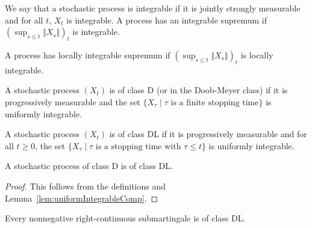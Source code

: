 \begin{definition}\label{def:HasIntegrableSup}
  \leanok
We say that a stochastic process is integrable if it is jointly strongly measurable and for all $t$, $X_t$ is integrable.
A process has an integrable supremum if $(\sup_{s \le t} \Vert X_s \Vert)_t$ is integrable.
\end{definition}

\begin{definition}\label{def:locallyIntegrableSup}
  \leanok
A process has locally integrable supremum if $(\sup_{s \le t} \Vert X_s \Vert)_t$ is locally integrable.
\end{definition}


\begin{definition}\label{def:classD}
  \leanok
A stochastic process $(X_t)$ is of class D (or in the Doob-Meyer class) if it is progressively measurable and the set $\{X_\tau \mid \tau \text{ is a finite stopping time}\}$ is uniformly integrable.
\end{definition}


\begin{definition}[Class DL]\label{def:classDL}
  \leanok
A stochastic process $(X_t)$ is of class DL if it is progressively measurable and for all $t \ge 0$, the set $\{X_\tau \mid \tau \text{ is a stopping time with } \tau \le t\}$ is uniformly integrable.
\end{definition}

\begin{lemma}\label{lem:classDLOfClassD}
  \leanok
A stochastic process of class D is of class DL.
\end{lemma}

\begin{proof}
  \leanok
This follows from the definitions and Lemma~\ref{lem:uniformIntegrableComp}.
\end{proof}

\begin{lemma}\label{lem:Submartingale.classDL}
  \leanok
Every nonnegative right-continuous submartingale is of class DL.
\end{lemma}

